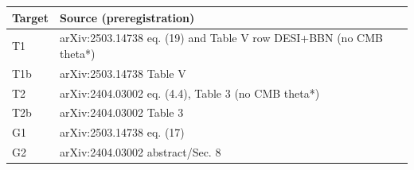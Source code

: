 \begin{tabular}{lp{11cm}}
\toprule
Target & Source (preregistration) \\
\midrule
T1 & \scriptsize arXiv:2503.14738 eq. (19) and Table V row DESI+BBN (no CMB theta*) \\
T1b & \scriptsize arXiv:2503.14738 Table V \\
T2 & \scriptsize arXiv:2404.03002 eq. (4.4), Table 3 (no CMB theta*) \\
T2b & \scriptsize arXiv:2404.03002 Table 3 \\
G1 & \scriptsize arXiv:2503.14738 eq. (17) \\
G2 & \scriptsize arXiv:2404.03002 abstract/Sec. 8 \\
\bottomrule
\end{tabular}
